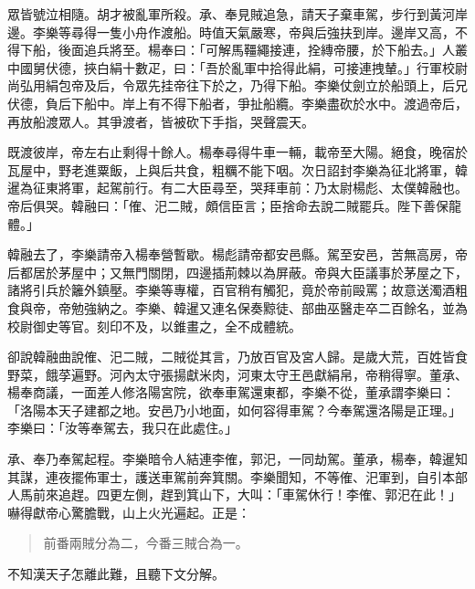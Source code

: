 眾皆號泣相隨。胡才被亂軍所殺。承、奉見賊追急，請天子棄車駕，步行到黃河岸邊。李樂等尋得一隻小舟作渡船。時值天氣嚴寒，帝與后強扶到岸。邊岸又高，不得下船，後面追兵將至。楊奉曰：「可解馬韁繩接連，拴縳帝腰，於下船去。」人叢中國舅伏德，挾白絹十數疋，曰：「吾於亂軍中拾得此絹，可接連拽輦。」行軍校尉尚弘用絹包帝及后，令眾先挂帝往下於之，乃得下船。李樂仗劍立於船頭上，后兄伏德，負后下船中。岸上有不得下船者，爭扯船纜。李樂盡砍於水中。渡過帝后，再放船渡眾人。其爭渡者，皆被砍下手指，哭聲震天。

既渡彼岸，帝左右止剩得十餘人。楊奉尋得牛車一輛，載帝至大陽。絕食，晚宿於瓦屋中，野老進粟飯，上與后共食，粗糲不能下咽。次日詔封李樂為征北將軍，韓暹為征東將軍，起駕前行。有二大臣尋至，哭拜車前：乃太尉楊彪、太僕韓融也。帝后俱哭。韓融曰：「傕、汜二賊，頗信臣言；臣捨命去說二賊罷兵。陛下善保龍體。」

韓融去了，李樂請帝入楊奉營暫歇。楊彪請帝都安邑縣。駕至安邑，苦無高房，帝后都居於茅屋中；又無門關閉，四邊插荊棘以為屏蔽。帝與大臣議事於茅屋之下，諸將引兵於籬外鎮壓。李樂等專權，百官稍有觸犯，竟於帝前毆罵；故意送濁酒粗食與帝，帝勉強納之。李樂、韓暹又連名保奏黥徒、部曲巫醫走卒二百餘名，並為校尉御史等官。刻印不及，以錐畫之，全不成體統。

卻說韓融曲說傕、汜二賊，二賊從其言，乃放百官及宮人歸。是歲大荒，百姓皆食野菜，餓莩遍野。河內太守張揚獻米肉，河東太守王邑獻絹帛，帝稍得寧。董承、楊奉商議，一面差人修洛陽宮院，欲奉車駕還東都，李樂不從，董承謂李樂曰：「洛陽本天子建都之地。安邑乃小地面，如何容得車駕？今奉駕還洛陽是正理。」李樂曰：「汝等奉駕去，我只在此處住。」

承、奉乃奉駕起程。李樂暗令人結連李傕，郭汜，一同劫駕。董承，楊奉，韓暹知其謀，連夜擺佈軍士，護送車駕前奔箕關。李樂聞知，不等傕、汜軍到，自引本部人馬前來追趕。四更左側，趕到箕山下，大叫：「車駕休行！李傕、郭汜在此！」嚇得獻帝心驚膽戰，山上火光遍起。正是：

\begin{quote}
前番兩賊分為二，今番三賊合為一。
\end{quote}

不知漢天子怎離此難，且聽下文分解。
